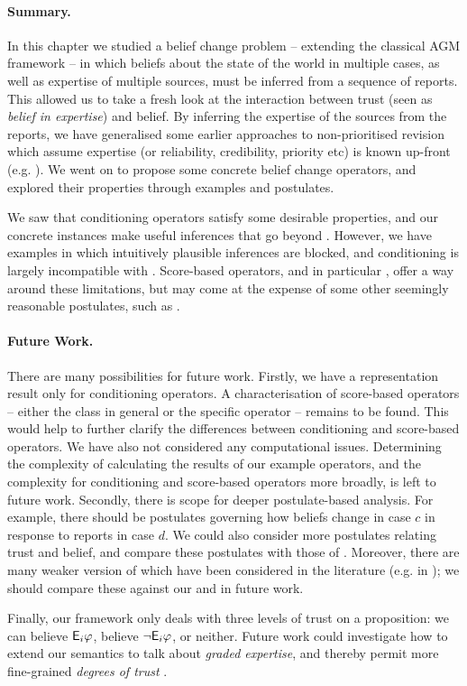 \paragraph{Summary.} In this chapter we studied a belief change problem --
extending the classical AGM framework -- in which
beliefs about the state of the world in multiple cases, as well as expertise of
multiple sources, must be inferred from a sequence of reports. This allowed us
to take a fresh look at the
interaction between trust (seen as \emph{belief in expertise}) and belief.
By inferring the expertise of the sources from the reports,
we have generalised some earlier approaches to non-prioritised
revision which assume expertise (or reliability, credibility, priority
etc) is known up-front (e.g.
\cite{ferme1999selective,hansson_2001,booth_trust_2018,delgrande2006iterated}).
We went on to propose some concrete belief change operators, and explored their
properties through examples and postulates.

We saw that conditioning operators satisfy some desirable
properties, and our concrete instances make useful inferences that go
beyond \weakop{}. However, we have examples in which intuitively plausible
inferences are blocked, and conditioning is largely incompatible with
\strongcondsucc{}. Score-based operators, and in particular \scorebasedop{},
offer a way around these limitations, but may
come at the expense of some other seemingly reasonable postulates, such as
\duprem{}.

\paragraph{Future Work.} There are many possibilities for future work.
%
Firstly, we have a representation result only for conditioning operators. A
characterisation of score-based operators -- either the class in general or the
specific operator \scorebasedop{} -- remains to be found. This would help to
further clarify the differences between conditioning and score-based operators.
%
We have also not considered any computational issues. Determining the
complexity of calculating the results of our example operators, and the
complexity for conditioning and score-based operators more broadly, is left to
future work.
%
Secondly, there is scope for deeper postulate-based analysis. For example,
there should be postulates governing how beliefs change in case $c$ in response
to reports in case $d$. We could also consider more postulates relating trust
and belief, and compare these postulates with those of \textcite{yasser_21}.
Moreover, there are many weaker version of  which have
been considered in the literature (e.g. in
\cite{ferme1999selective,hansson_2001,booth_trust_2018}); we should compare
these against our \condsucc{} and \strongcondsucc{} in future work.

Finally, our framework only deals with three levels of trust on a proposition:
we can believe $\mathsf{E}_i\varphi$, believe $\neg \mathsf{E}_i\varphi$, or neither.
Future work could investigate how to extend our semantics to talk about \emph{graded
expertise}, and thereby permit more fine-grained \emph{degrees of trust}
\cite{hunter_building_21,yasser_21,delgrande2006iterated}.
